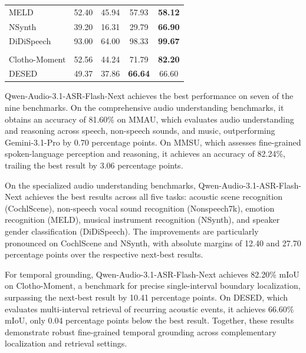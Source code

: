 \documentclass{article}
\begin{document}
\begin{table}[t]
{\begin{tabular}{lcccc}
        MELD          & 52.40 & 45.94 & 57.93 & \textbf{58.12} \\
        NSynth        & 39.20 & 16.31 & 29.79 & \textbf{66.90} \\
        DiDiSpeech    & 93.00 & 64.00 & 98.33 & \textbf{99.67} \\
        \midrule
        \rowcolor{QwenPurpleLight}
        \multicolumn{5}{c}{\color{QwenPurple}\bfseries Temporal Grounding (mIoU)} \\
        Clotho-Moment & 52.56 & 44.24 & 71.79 & \textbf{82.20} \\
        DESED         & 49.37 & 37.86 & \textbf{66.64} & 66.60 \\
        \bottomrule
    \end{tabular}}
    \endgroup
\end{table}
Qwen-Audio-3.1-ASR-Flash-Next achieves the best performance on seven of the nine benchmarks. On the comprehensive audio understanding benchmarks, it obtains an accuracy of 81.60\% on MMAU, which evaluates audio understanding and reasoning across speech, non-speech sounds, and music, outperforming Gemini-3.1-Pro by 0.70 percentage points. On MMSU, which assesses fine-grained spoken-language perception and reasoning, it achieves an accuracy of 82.24\%, trailing the best result by 3.06 percentage points.

On the specialized audio understanding benchmarks, Qwen-Audio-3.1-ASR-Flash-Next achieves the best results across all five tasks: acoustic scene recognition (CochlScene), non-speech vocal sound recognition (Nonspeech7k), emotion recognition (MELD), musical instrument recognition (NSynth), and speaker gender classification (DiDiSpeech). The improvements are particularly pronounced on CochlScene and NSynth, with absolute margins of 12.40 and 27.70 percentage points over the respective next-best results.

For temporal grounding, Qwen-Audio-3.1-ASR-Flash-Next achieves 82.20\% mIoU on Clotho-Moment, a benchmark for precise single-interval boundary localization, surpassing the next-best result by 10.41 percentage points. On DESED, which evaluates multi-interval retrieval of recurring acoustic events, it achieves 66.60\% mIoU, only 0.04 percentage points below the best result. Together, these results demonstrate robust fine-grained temporal grounding across complementary localization and retrieval settings.

%
%
%
%
%
%
%
%
%
%
%
%
%
%
\end{document}
